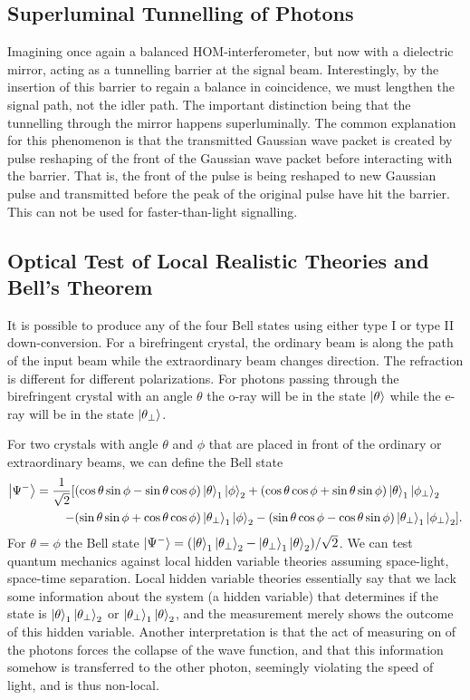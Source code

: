\subsection{Superluminal Tunnelling of Photons}
Imagining once again a balanced HOM-interferometer, but now with a dielectric mirror, acting as a tunnelling barrier at the signal beam. Interestingly, by the insertion of this barrier to regain a balance in coincidence, we must lengthen the signal path, not the idler path. The important distinction being that the tunnelling through the mirror happens superluminally. The common explanation for this phenomenon is that the transmitted Gaussian wave packet is created by pulse reshaping of the front of the Gaussian wave packet before interacting with the barrier. That is, the front of the pulse is being reshaped to new Gaussian pulse and transmitted before the peak of the original pulse have hit the barrier. This can not be used for faster-than-light signalling. 

\subsection{Optical Test of Local Realistic Theories and Bell's Theorem}
It is possible to produce any of the four Bell states using either type I or type II down-conversion. For a birefringent crystal, the ordinary beam is along the path of the input beam while the extraordinary beam changes direction. The refraction is different for different polarizations. For photons passing through the birefringent crystal with an angle $\theta$ the o-ray will be in the state $\ket{\theta}$ while the e-ray will be in the state $\ket{\theta_\perp}$.

For two crystals with angle $\theta$ and $\phi$ that are placed in front of the ordinary or extraordinary beams, we can define the Bell state
\begin{align}
    \ket{\Psi^-} = \frac{1}{\sqrt{2}}  [ &(\cos\theta\sin\phi - \sin\theta\cos\phi) \ket{\theta}_1\ket{\phi}_2 + (\cos\theta\cos\phi + \sin\theta\sin\phi)\ket{\theta}_1\ket{\phi_\perp}_2\\
    -&(\sin\theta\sin\phi + \cos\theta\cos\phi)\ket{\theta_\perp}_1\ket{\phi}_2 - (\sin\theta\cos\phi - \cos\theta\sin\phi)\ket{\theta_\perp}_1\ket{\phi_\perp}_2].
\end{align}
For $\theta=\phi$ the Bell state $\ket{\Psi^-} = (\ket{\theta}_1\ket{\theta_\perp}_2 - \ket{\theta_\perp}_1\ket{\theta}_2)/\sqrt{2}$. We can test quantum mechanics against local hidden variable theories assuming space-light, space-time separation. Local hidden variable theories essentially say that we lack some information about the system (a hidden variable) that determines if the state is $\ket{\theta}_1\ket{\theta_\perp}_2$ or $\ket{\theta_\perp}_1\ket{\theta}_2$, and the measurement merely shows the outcome of this hidden variable. Another interpretation is that the act of measuring on of the photons forces the collapse of the wave function, and that this information somehow is transferred to the other photon, seemingly violating the speed of light, and is thus non-local.

